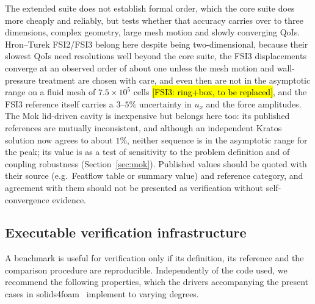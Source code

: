The extended suite does not establish formal order, which the core suite does more cheaply and reliably, but tests whether that accuracy carries over to three dimensions, complex geometry, large mesh motion and slowly converging QoIs.
Hron--Turek FSI2/FSI3 belong here despite being two-dimensional, because their slowest QoIs need resolutions well beyond the core suite, the FSI3 displacements converge at an observed order of about one unless the mesh motion and wall-pressure treatment are chosen with care, and even then are not in the asymptotic range on a fluid mesh of $7.5\times10^5$ cells \hl{[FSI3: ring+box, to be replaced]}, and the FSI3 reference itself carries a $3$--$5\%$ uncertainty in $u_x$ and the force amplitudes.
The Mok lid-driven cavity is inexpensive but belongs here too: its published references are mutually inconsistent, and although an independent Kratos solution now agrees to about $1\%$, neither sequence is in the asymptotic range for the peak; its value is as a test of sensitivity to the problem definition and of coupling robustness (Section~\ref{sec:mok}).
Published values should be quoted with their source (e.g.\ Featflow table or summary value) and reference category, and agreement with them should not be presented as verification without self-convergence evidence.


\subsection{Executable verification infrastructure}\label{sec:infrastructure}

A benchmark is useful for verification only if its definition, its reference and the comparison procedure are reproducible.
Independently of the code used, we recommend the following properties, which the drivers accompanying the present cases in solids4foam~\citep{Cardiff2025} implement to varying degrees.

